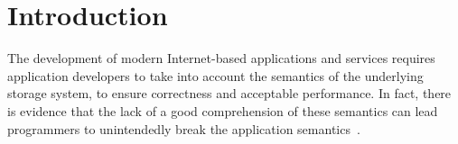 \documentclass{sig-alternate-05-2015}
\begin{document}
\begin{abstract}
\end{abstract}

\section{Introduction}

   The development of modern Internet-based applications and services requires application developers to take into account the semantics of the 
underlying storage system, to ensure correctness and acceptable performance.
In fact, there is evidence that the lack of a good comprehension of these
semantics can lead programmers to unintendedly break the application semantics~\cite{bailis:feral}. 
\end{document}
